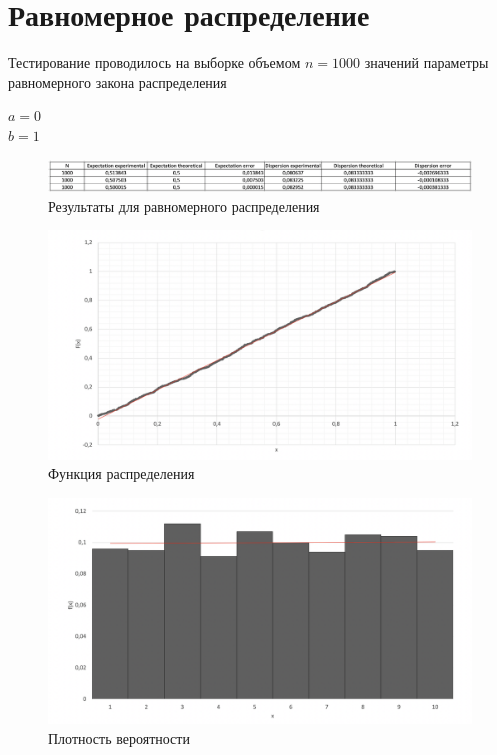 \documentclass{article}
\begin{document}
	\section{Равномерное распределение}
		Тестирование проводилось на выборке объемом $n = 1000$ значений параметры равномерного закона распределения
		\begin{center}
			$a = 0$\\ 
			$b = 1$\\
		\end{center}
		\begin{center}
			\begin{figure}[!htb]
				\includegraphics[scale = 0.43]{uniform/3.png}
				\caption{Результаты для равномерного распределения}
			\end{figure}
		\end{center}
		
		\begin{figure}[!htb]
		    \includegraphics[scale = 0.3]{uniform/1.png}
    		\caption{Функция распределения}
		\end{figure}
		 	 	
		\begin{figure}[!htb]
			\includegraphics[scale = 0.3]{uniform/2.png}
			\caption{Плотность вероятности}
   		\end{figure}
   	\newpage
										
\end{document}
